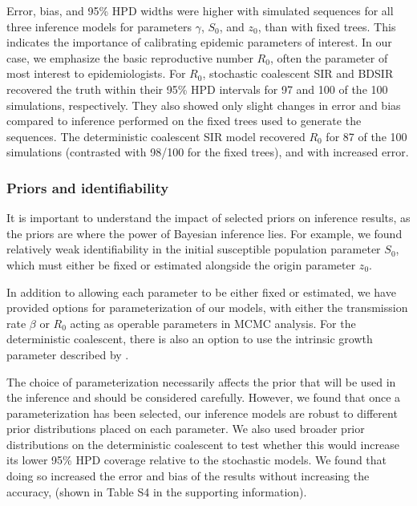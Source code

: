 \documentclass[12pt,titlepage]{article}
\newcommand{\stochCoalSIR}{stochastic coalescent SIR}
\newcommand{\deterCoalSIR}{deterministic coalescent SIR}
\newcommand{\BDSIR}{BDSIR}
\begin{document}
Error, bias, and 95\% HPD widths were higher with simulated sequences for all three inference models for parameters $\gamma$, $S_0$, and $z_0$, than with fixed trees.  
This indicates the importance of calibrating epidemic parameters of interest.  In our case, we emphasize the basic reproductive number $R_0$, often the parameter of most interest to epidemiologists.  
For $R_0$, \stochCoalSIR{} and \BDSIR{} recovered the truth within their 95\% HPD intervals for 97 and 100 of the 100 simulations, respectively.  
They also showed only slight changes in error and bias compared to inference performed on the fixed trees used to generate the sequences.  
The \deterCoalSIR{} model recovered $R_0$ for 87 of the 100 simulations (contrasted with 98/100 for the fixed trees), and with increased error.


\subsubsection{Priors and identifiability} It is important to understand the impact of selected priors on inference results, as the priors are where the power of Bayesian inference lies.  
For example, we found relatively weak identifiability in the initial susceptible population parameter $S_0$, which must either be fixed or estimated alongside the origin parameter $z_0$.  

In addition to allowing each parameter to be either fixed or estimated, we have provided options for parameterization of our models, with either the transmission rate $\beta$ or $R_0$ acting as operable parameters in MCMC analysis.  For the deterministic coalescent, there is also an option to use the 
intrinsic growth parameter described by \cite{DearloveandWilson}.  

The choice of parameterization necessarily affects the prior that will be used in the inference and should be considered carefully.  However, we found that once a parameterization has been selected, our inference models are robust to different prior distributions placed on each parameter.  
We also used broader prior distributions on the deterministic coalescent to test whether this would increase its lower 95\% HPD coverage relative to the stochastic models.  We found that doing so increased the error and bias of the results without increasing the accuracy, (shown in Table S4 in the supporting information).
\end{document}
